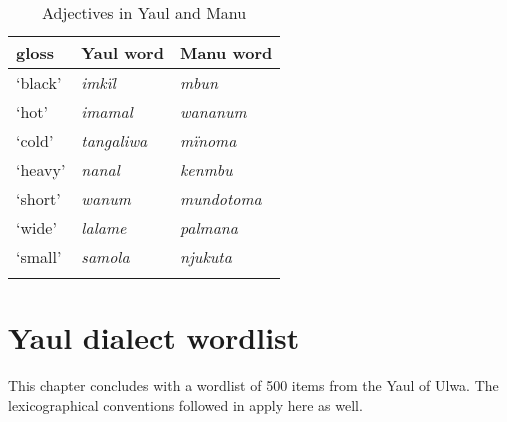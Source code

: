 \begin{table}
\caption{Adjectives in Yaul and Manu}
\label{tab:18.26}


\begin{tabular}{lll}

\lsptoprule

gloss & Yaul word & Manu word\\
\midrule
‘black’ & {\itshape imkïl} & {\itshape mbun}\\
‘hot’ & {\itshape imamal} & {\itshape wananum}\\
‘cold’ & {\itshape tangaliwa} & {\itshape mïnoma}\\
‘heavy’ & {\itshape nanal} & {\itshape kenmbu}\\
‘short’ & {\itshape wanum} & {\itshape mundotoma}\\
‘wide’ & {\itshape lalame} & {\itshape palmana}\\
‘small’ & {\itshape samola} & {\itshape njukuta}\\
\lspbottomrule
\end{tabular}
\end{table}



\pagebreak
\section{\label{sec:18.7}  Yaul dialect wordlist}


This chapter concludes with a wordlist of 500 items from the Yaul  of Ulwa. The lexicographical conventions followed in  apply here as well.


